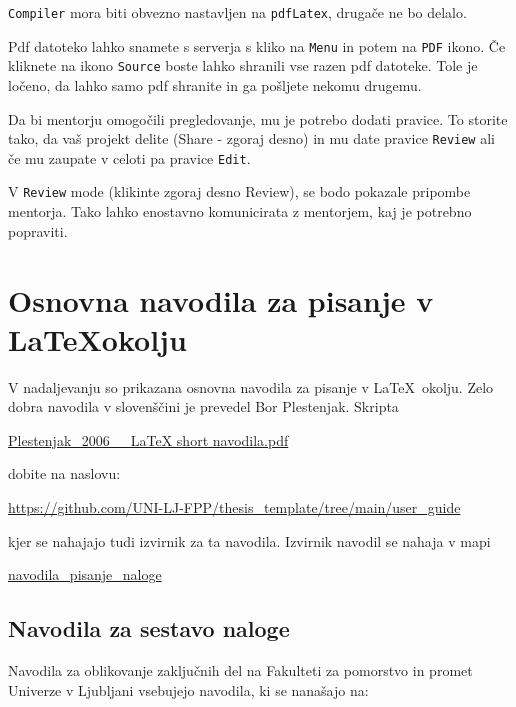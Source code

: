 \documentclass[12pt]{article}
\theoremstyle{definition}
\begin{document}
\texttt{Compiler} mora biti obvezno nastavljen na \texttt{pdfLatex}, drugače ne bo delalo. 

Pdf datoteko lahko snamete s serverja s kliko na \texttt{Menu} in potem na \texttt{PDF} ikono. Če kliknete na ikono \texttt{Source} boste lahko shranili vse razen pdf datoteke. Tole je ločeno, da lahko samo pdf shranite in ga pošljete nekomu drugemu.

Da bi mentorju omogočili pregledovanje, mu je potrebo dodati pravice. To storite tako, da vaš projekt delite (Share - zgoraj desno) in mu date pravice \texttt{Review} ali če mu zaupate v celoti pa pravice \texttt{Edit}.

V \texttt{Review} mode (klikinte zgoraj desno Review), se bodo pokazale pripombe mentorja. Tako lahko enostavno komunicirata z mentorjem, kaj je potrebno popraviti. 


\newpage
\section{Osnovna navodila za pisanje v \LaTeX okolju}
\label{sec:Navodila}

V nadaljevanju so prikazana osnovna navodila za pisanje v \LaTeX~okolju. Zelo dobra navodila v slovenščini je prevedel Bor Plestenjak. Skripta

\href{https://github.com/UNI-LJ-FPP/thesis_template/blob/main/user_guide/Plestenjak_2006__LaTeX%20short%20navodila.pdf}{Plestenjak\_2006\_\_LaTeX short navodila.pdf}

dobite na naslovu:

\href{https://github.com/UNI-LJ-FPP/thesis_template/tree/main/user_guide}{https://github.com/UNI-LJ-FPP/thesis\_template/tree/main/user\_guide}

kjer se nahajajo tudi izvirnik za ta navodila. Izvirnik navodil se nahaja v mapi

\href{https://github.com/UNI-LJ-FPP/thesis_template/tree/main/user_guide/navodila_pisanje_naloge}{navodila\_pisanje\_naloge}

\subsection{Navodila za sestavo naloge}

Navodila za oblikovanje zaključnih del na Fakulteti za pomorstvo in promet Univerze v Ljubljani vsebujejo navodila, ki se nanašajo na:
\end{document}
